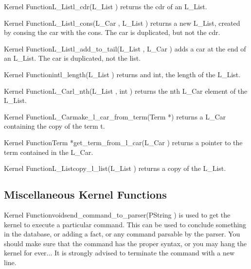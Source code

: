 \begin{typefn}{Kernel Function}{L\_List}{l\_cdr}{(L\_List )}
returns the cdr of an L\_List.
\end{typefn}

\begin{typefn}{Kernel Function}{L\_List}{l\_cons}{(L\_Car , L\_List
)}
returns a new L\_List, created by consing the car with the cons. The car is
duplicated, but not the cdr.
\end{typefn}

\begin{typefn}{Kernel Function}{L\_List}{l\_add\_to\_tail}{(L\_List ,
L\_Car )}
adds a car at the end of an L\_List. The car is duplicated, not the list.
\end{typefn}

\begin{typefn}{Kernel Function}{int}{l\_length}{(L\_List )}
returns and int, the length of the L\_List.
\end{typefn}

\begin{typefn}{Kernel Function}{L\_Car}{l\_nth}{(L\_List , int )}
returns the nth L\_Car element of the L\_List.
\end{typefn}

\begin{typefn}{Kernel Function}{L\_Car}{make\_l\_car\_from\_term}{(Term *)}
returns a L\_Car containing the copy of the term t.
\end{typefn}

\begin{typefn}{Kernel Function}{Term *}{get\_term\_from\_l\_car}{(L\_Car )}
returns a pointer to the term contained in the L\_Car.
\end{typefn}

\begin{typefn}{Kernel Function}{L\_List}{copy\_l\_list}{(L\_List )}
returns a copy of the L\_List.
\end{typefn}

\subsection{Miscellaneous Kernel Functions}

\begin{typefn}{Kernel Function}{void}{send\_command\_to\_parser}{(PString )}
is used to get the kernel to execute a particular command. This can be used to
conclude something in the database, or adding a fact, or any command parsable
by the parser. You should make sure that the command has the proper syntax, or
you may hang the kernel for ever... It is strongly advised to terminate the
command with a new line.
\end{typefn}


